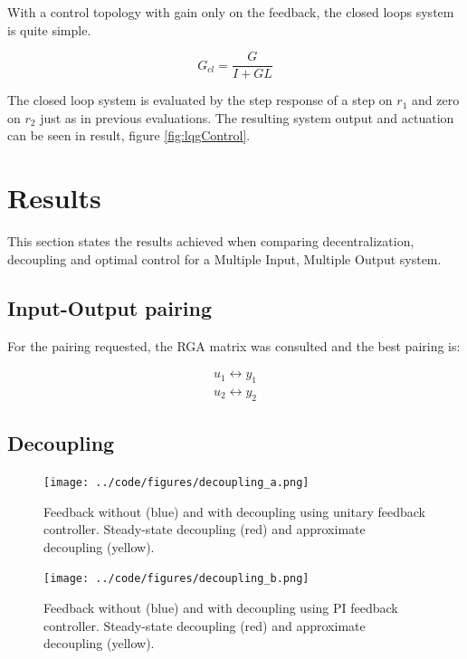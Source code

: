 \documentclass[a4paper, titlepage]{article}
\begin{document}
With a control topology with gain only on the feedback, the closed loops system is quite simple.

\begin{equation}
G_{cl} = \frac{G}{I + GL}
\end{equation}

The closed loop system is evaluated by the step response of a step on $r_1$ and zero on $r_2$ just as in previous evaluations.
The resulting system output and actuation can be seen in result, figure \ref{fig:lqgControl}.


\section{Results}
This section states the results achieved when comparing decentralization, decoupling and optimal control for a Multiple Input, Multiple Output system.

\subsection{Input-Output pairing}
For the pairing requested, the RGA matrix was consulted and the best pairing is:

\begin{equation}
\begin{split}
u_1 \leftrightarrow y_1 \\
u_2 \leftrightarrow y_2
\end{split}
\end{equation}

\subsection{Decoupling}

\begin{figure}[H]
\center
\texttt{[image: ../code/figures/decoupling\_a.png]}
\caption{Feedback without (blue) and with decoupling using unitary feedback controller. Steady-state decoupling (red) and approximate decoupling (yellow).}
\label{fig:decouplingA}
\end{figure}


\begin{figure}[H]
\center
\texttt{[image: ../code/figures/decoupling\_b.png]}
\caption{Feedback without (blue) and with decoupling using PI feedback controller. Steady-state decoupling (red) and approximate decoupling (yellow).}
\label{fig:decouplingB}
\end{figure}
\end{document}
